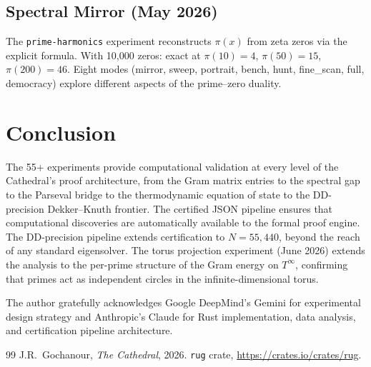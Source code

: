 \documentclass[11pt,a4paper]{article}
\begin{document}
\subsection{Spectral Mirror (May 2026)}

The \texttt{prime-harmonics} experiment reconstructs $\pi(x)$ from
zeta zeros via the explicit formula. With 10{,}000 zeros: exact at
$\pi(10) = 4$, $\pi(50) = 15$, $\pi(200) = 46$. Eight modes
(mirror, sweep, portrait, bench, hunt, fine\_scan, full, democracy)
explore different aspects of the prime--zero duality.

\section{Conclusion}

The 55+ experiments provide computational validation at every level
of the Cathedral's proof architecture, from the Gram matrix entries
to the spectral gap to the Parseval bridge to the thermodynamic
equation of state to the DD-precision Dekker--Knuth frontier.
The certified JSON pipeline ensures that
computational discoveries are automatically available to the formal
proof engine. The DD-precision pipeline extends certification to
$N = 55{,}440$, beyond the reach of any standard eigensolver.
The torus projection experiment (June 2026) extends the analysis
to the per-prime structure of the Gram energy on $T^\infty$,
confirming that primes act as independent circles in the
infinite-dimensional torus.

The author gratefully acknowledges Google DeepMind's Gemini for
experimental design strategy and Anthropic's Claude for Rust
implementation, data analysis, and certification pipeline architecture.

\begin{thebibliography}{99}
J.R.~Gochanour, \emph{The Cathedral}, 2026.
\texttt{rug} crate, \url{https://crates.io/crates/rug}.
\end{thebibliography}
\end{document}

